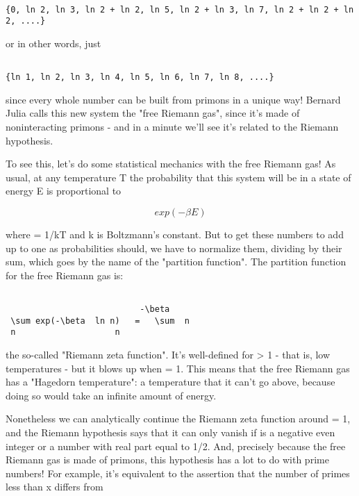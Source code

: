 \begin{verbatim}

{0, ln 2, ln 3, ln 2 + ln 2, ln 5, ln 2 + ln 3, ln 7, ln 2 + ln 2 + ln 2, ....}
\end{verbatim}
    
or in other words, just


\begin{verbatim}

{ln 1, ln 2, ln 3, ln 4, ln 5, ln 6, ln 7, ln 8, ....}
\end{verbatim}
    
since every whole number can be built from primons in a unique way!
Bernard Julia calls this new system the "free Riemann gas", since it's made
of noninteracting primons - and in a minute we'll see it's related to the 
Riemann hypothesis.

To see this, let's do some statistical mechanics with the free Riemann gas!  
As usual, at any temperature T the probability that this system will be in a 
state of energy E is proportional to


$$

exp(-\beta E)
$$
    
where \beta  = 1/kT and k is Boltzmann's constant.  But to get these
numbers to add up to one as probabilities should, we have to normalize
them, dividing by their sum, which goes by the name of the "partition
function".  The partition function for the free Riemann gas is:


\begin{verbatim}

                           -\beta 
 \sum exp(-\beta  ln n)   =   \sum  n
 n                    n
\end{verbatim}
    

the so-called "Riemann zeta function".  It's well-defined for \beta  > 1 -
that is, low temperatures - but it blows up when \beta  = 1.  This means that 
the free Riemann gas has a "Hagedorn temperature": a temperature that it 
can't go above, because doing so would take an infinite amount of energy.  

Nonetheless we can analytically continue the Riemann zeta function
around \beta  = 1, and the Riemann hypothesis says that it can only
vanish if \beta  is a negative even integer or a number with real part
equal to 1/2.  And, precisely because the free Riemann gas is made of
primons, this hypothesis has a lot to do with prime numbers!  For
example, it's equivalent to the assertion that the number of primes
less than x differs from


